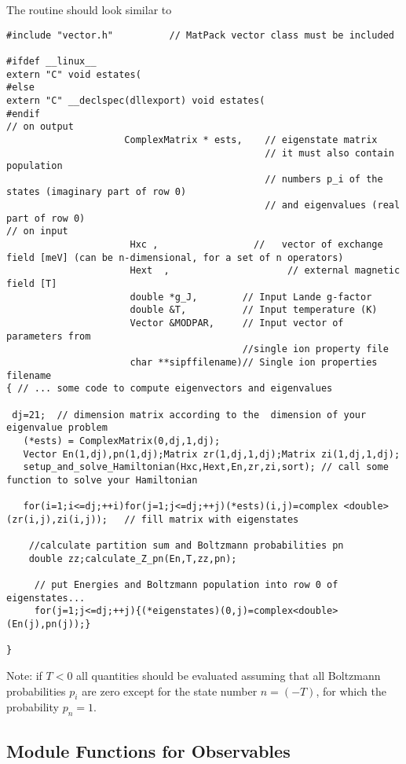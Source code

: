 The routine should look similar to
{\footnotesize
\begin{verbatim}
#include "vector.h"          // MatPack vector class must be included

#ifdef __linux__
extern "C" void estates(
#else
extern "C" __declspec(dllexport) void estates(
#endif
// on output
                     ComplexMatrix * ests,    // eigenstate matrix      
                                              // it must also contain population 
                                              // numbers p_i of the states (imaginary part of row 0)
                                              // and eigenvalues (real part of row 0)
// on input
                      Hxc ,                 //   vector of exchange field [meV] (can be n-dimensional, for a set of n operators)
                      Hext  ,                     // external magnetic field [T]
                      double *g_J,        // Input Lande g-factor
                      double &T,          // Input temperature (K)
                      Vector &MODPAR,     // Input vector of parameters from 
					                      //single ion property file
                      char **sipffilename)// Single ion properties filename                      
{ // ... some code to compute eigenvectors and eigenvalues

 dj=21;  // dimension matrix according to the  dimension of your eigenvalue problem
   (*ests) = ComplexMatrix(0,dj,1,dj);
   Vector En(1,dj),pn(1,dj);Matrix zr(1,dj,1,dj);Matrix zi(1,dj,1,dj);
   setup_and_solve_Hamiltonian(Hxc,Hext,En,zr,zi,sort); // call some function to solve your Hamiltonian
   
   for(i=1;i<=dj;++i)for(j=1;j<=dj;++j)(*ests)(i,j)=complex <double> (zr(i,j),zi(i,j));   // fill matrix with eigenstates
 
    //calculate partition sum and Boltzmann probabilities pn
    double zz;calculate_Z_pn(En,T,zz,pn);

     // put Energies and Boltzmann population into row 0 of eigenstates...
     for(j=1;j<=dj;++j){(*eigenstates)(0,j)=complex<double>(En(j),pn(j));}

}
\end{verbatim}
Note: if $T<0$ all quantities should be evaluated assuming that all Boltzmann probabilities $p_i$
 are zero except for the state number $n=(-T)$, for which the probability $p_n=1$.
}



\subsection{Module Functions for Observables}


